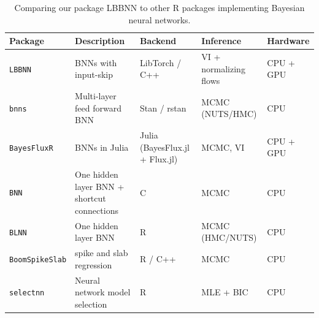 \setlength{\tabcolsep}{3pt}  %

{\scriptsize
\begin{table}[ht]
\centering
\caption{Comparing our package LBBNN to other R packages implementing Bayesian neural networks.}
\begin{tabularx}{\textwidth}{l X X X X}
\hline
\textbf{Package} & \textbf{Description} & \textbf{Backend} & 
\textbf{Inference} & \textbf{Hardware} \\
\hline

\texttt{LBBNN} & BNNs with input-skip &
LibTorch / C++ & 
VI + normalizing flows &
CPU + GPU\\

\texttt{bnns} & Multi-layer feed forward BNN &
Stan / rstan &
MCMC (NUTS/HMC) &
CPU \\

\texttt{BayesFluxR} & BNNs in Julia &
Julia (BayesFlux.jl + Flux.jl) &
MCMC, VI  &
CPU + GPU \\

\texttt{BNN} & One hidden layer BNN + shortcut connections &
C &
MCMC &
CPU \\

\texttt{BLNN} & One hidden layer BNN &
R &
MCMC (HMC/NUTS) &
CPU \\
\texttt{BoomSpikeSlab} & spike and slab regression &
R / C++ &
MCMC &
CPU \\
\texttt{selectnn} & Neural network model selection &
R  &
MLE + BIC &
CPU \\

\hline
\end{tabularx}
\label{table:Rpackages}
\end{table}
}

